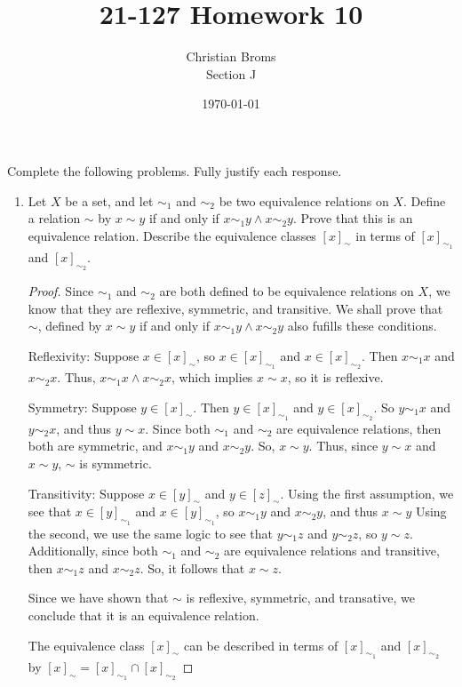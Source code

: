\documentclass[12pt]{article}
\begin{document}
\title{21-127 Homework 10
}
\author{Christian Broms \\ Section J}
\date{\today}
\maketitle
Complete the following problems. Fully justify each response.


\begin{enumerate}

\item Let $X$ be a set, and let $\sim_1$ and $\sim_2$ be two equivalence relations on $X$. Define a relation $\sim$ by $x\sim y$ if and only if $x\sim_1 y \wedge x\sim_2 y$. Prove that this is an equivalence relation. Describe the equivalence classes $[x]_\sim$ in terms of $[x]_{\sim_1}$ and $[x]_{\sim_2}$.

\begin{proof}
Since $\sim_1$ and $\sim_2$ are both defined to be equivalence relations on $X$, we know that they are reflexive, symmetric, and transitive. We shall prove that $\sim$, defined by $x\sim y$ if and only if $x\sim_1 y \wedge x\sim_2 y$ also fufills these conditions. 

Reflexivity: Suppose $x \in [x]_\sim$, so $x \in [x]_{\sim_1}$ and $x \in [x]_{\sim_2}$. Then $x\sim_1 x$ and $x\sim_2 x$. Thus, $x\sim_1 x \wedge x\sim_2 x$, which implies $x\sim x$, so it is reflexive. 

Symmetry: Suppose $y \in [x]_\sim$. Then $y \in [x]_{\sim_1}$ and $y \in [x]_{\sim_2}$. So $y \sim_1 x$ and $y \sim_2 x$, and thus $y \sim x$. Since both $\sim_1$ and $\sim_2$ are equivalence relations, then both are symmetric, and $x \sim_1 y$ and $x \sim_2 y$. So, $x \sim y$. Thus, since $y \sim x$ and $x \sim y$, $\sim$ is symmetric. 

Transitivity: Suppose $x \in [y]_\sim$ and $y \in [z]_\sim$. Using the first assumption, we see that $x \in [y]_{\sim_1}$ and $x \in [y]_{\sim_1}$, so $x \sim_1 y$ and $x \sim_2 y$, and thus $x \sim y$ Using the second, we use the same logic to see that $y \sim_1 z$ and $y \sim_2 z$, so $y \sim z$. Additionally, since both $\sim_1$ and $\sim_2$ are equivalence relations and transitive, then $x \sim_1 z$ and $x \sim_2 z$. So, it follows that $x \sim z$. 

Since we have shown that $\sim$ is reflexive, symmetric, and transative, we conclude that it is an equivalence relation. 

The equivalence class $[x]_\sim$ can be described in terms of $[x]_{\sim_1}$ and $[x]_{\sim_2}$ by  $[x]_\sim = [x]_{\sim_1} \cap [x]_{\sim_2}$
\end{proof}


\end{enumerate}
\end{document}
